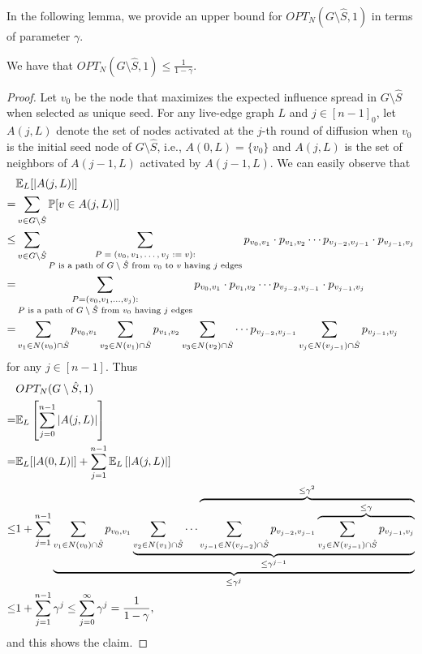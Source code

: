 In the following lemma, we provide an upper bound for $OPT_N(G\setminus \hat{S},1)$ in terms of parameter $\gamma$.
\begin{lemma}\label{lemlast2}
We have that $OPT_N(G\setminus \hat{S},1)\leq \frac{1}{1-\gamma}$. 
\end{lemma}
\begin{proof}
Let $v_0$ be the node that maximizes the expected influence spread in $G\setminus \hat{S}$ when selected as unique seed. For any live-edge graph $L$ and $j\in [n-1]_0$, let $A(j,L)$ denote the set of nodes activated at the $j$-th round of diffusion when $v_0$ is the initial seed node of $G\setminus \hat{S}$, i.e., $A(0,L)=\{v_0\}$ and $A(j,L)$ is the set of neighbors of $A(j-1,L)$ activated by $A(j-1,L)$. We can easily observe that 
\begin{align*}
&\mathbb{E}_L[|A(j,L)|]\\
=&\sum_{v\in G\setminus \hat{S}}\mathbb{P}[v\in A(j,L)|]\\
\leq &\sum_{v\in G\setminus \hat{S}}\sum_{\substack{\text{$P=(v_0,v_1,\ldots, v_j:=v)$:}\\\text{$P$ is a path of $G\setminus \hat{S}$ from $v_0$ to $v$ having $j$ edges}}}p_{v_0,v_1}\cdot p_{v_1,v_2}\cdots p_{v_{j-2},v_{j-1}}\cdot p_{v_{j-1},v_{j}}\\
= &\sum_{\substack{P=(v_0,v_1,\ldots, v_j):\\\text{$P$ is a path of $G\setminus \hat{S}$ from $v_0$ having $j$ edges}}}p_{v_0,v_1}\cdot p_{v_1,v_2}\cdots p_{v_{j-2},v_{j-1}}\cdot p_{v_{j-1},v_{j}}\\
= &\sum_{v_1\in N(v_0)\cap \hat{S}}p_{v_0,v_1} \sum_{v_2\in N(v_1)\cap \hat{S}}p_{v_1,v_2}\sum_{v_3\in N(v_2)\cap \hat{S}}\cdots p_{v_{j-2},v_{j-1}}\sum_{v_{j}\in N(v_{j-1})\cap \hat{S}}p_{v_{j-1},v_j}
\end{align*}
for any $j\in [n-1]$. Thus 
\begin{align}
&OPT_N(G\setminus \hat{S},1)\nonumber\\
=&\mathbb{E}_L\left[\sum_{j=0}^{n-1}|A(j,L)|\right]\nonumber\\
=&\mathbb{E}_L[|A(0,L)|]+\sum_{j=1}^{n-1}\mathbb{E}_L\left[|A(j,L)|\right]\nonumber\\
\leq &1+\sum_{j=1}^{n-1}\underbrace{\sum_{v_1\in N(v_0)\cap\hat{S}}p_{v_0,v_1} \underbrace{\sum_{v_2\in N(v_1)\cap\hat{S}}\cdots \overbrace{\sum_{v_{j-1}\in N(v_{j-2})\cap\hat{S}}p_{v_{j-2},v_{j-1}}\overbrace{\sum_{v_{j}\in N(v_{j-1})\cap\hat{S}}p_{v_{j-1},v_j}}^{\leq \gamma}}^{\leq \gamma^2}}_{\leq \gamma^{j-1}}}_{\leq \gamma^j}\nonumber\\
\leq & 1+\sum_{j=1}^{n-1} \gamma^j\leq \sum_{j=0}^\infty \gamma^j=\frac{1}{1-\gamma},\nonumber
\end{align}
and this shows the claim.
\end{proof}
